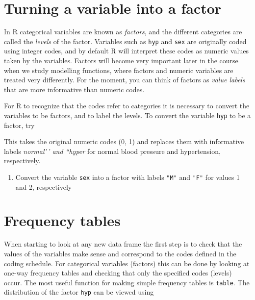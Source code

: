 \documentclass[
]{book}
\newenvironment{Shaded}{\begin{snugshade}}{\end{snugshade}}
\newcommand{\AttributeTok}[1]{\textcolor[rgb]{0.13,0.29,0.53}{#1}}
\newcommand{\FunctionTok}[1]{\textcolor[rgb]{0.13,0.29,0.53}{\textbf{#1}}}
\newcommand{\NormalTok}[1]{#1}
\newcommand{\OtherTok}[1]{\textcolor[rgb]{0.56,0.35,0.01}{#1}}
\newcommand{\SpecialCharTok}[1]{\textcolor[rgb]{0.81,0.36,0.00}{\textbf{#1}}}
\newcommand{\StringTok}[1]{\textcolor[rgb]{0.31,0.60,0.02}{#1}}
\providecommand{\tightlist}{%
  \setlength{\itemsep}{0pt}\setlength{\parskip}{0pt}}
\begin{document}
\section{Turning a variable into a factor}\label{turning-a-variable-into-a-factor}

In R categorical variables are known as \emph{factors}, and the
different categories are called the \emph{levels} of the factor.
Variables such as \texttt{hyp} and \texttt{sex} are originally coded using
integer codes, and by default R will interpret these codes as numeric
values taken by the variables. Factors will become very important
later in the course when we study modelling functions, where
factors and numeric variables are treated very differently. For the moment,
you can think of factors as \emph{value labels} that are more informative
than numeric codes.

For R to recognize that the codes refer to categories it is necessary
to convert the variables to be factors, and to label the levels. To
convert the variable \texttt{hyp} to be a factor, try

\begin{Shaded}
\end{Shaded}

This takes the original numeric codes (0, 1) and replaces them with
informative labels \emph{normal'\,' and ``hyper} for normal blood pressure
and hypertension, respectively.

\begin{enumerate}
\def\labelenumi{\arabic{enumi}.}
\tightlist
\item
  Convert the variable \texttt{sex} into a factor
  with labels \texttt{"M"} and \texttt{"F"} for values 1 and 2, respectively
\end{enumerate}

\section{Frequency tables}\label{frequency-tables}

When starting to look at any new data frame the first step is to check
that the values of the variables make sense and correspond to the
codes defined in the coding schedule. For categorical variables
(factors) this can be done by looking at one-way frequency tables and
checking that only the specified codes (levels) occur. The most
useful function for making simple frequency tables is \texttt{table}.
The distribution of the factor \texttt{hyp} can be viewed using
\end{document}
